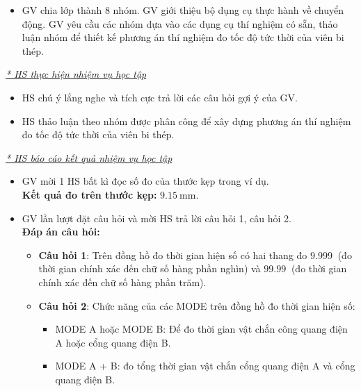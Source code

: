 {\begin{itemize}[label=-]
\begin{center}
		\end{center} 
		GV yêu cầu HS đọc phần sử dụng thiết bị đồng hồ đo thời gian hiện số trong phần chú ý SGK và trả lời các câu hỏi sau:
		\begin{itemize}[label=$\bullet$]
			\item \textbf{Câu hỏi 1:} Trên đồng hồ đo thời gian hiện số có mấy thang đo và ý nghĩa của mỗi thang đo là gì?
			\item \textbf{Câu hỏi 2:} Em hãy cho biết chức năng của các MODE  A, B, A+B, A$\leftrightarrow$B trên đồng hồ.
		\end{itemize} 
		\item GV chia lớp thành 8 nhóm. GV giới thiệu bộ dụng cụ thực hành về chuyển động. GV yêu cầu các nhóm dựa vào các dụng cụ thí nghiệm có sẵn, thảo luận nhóm để thiết kế phương án thí nghiệm đo tốc độ tức thời của viên bi thép.
	\end{itemize}
	\textit{\underline{* HS thực hiện nhiệm vụ học tập}}
	\begin{itemize}[label=-]
		\item HS chú ý lắng nghe và tích cực trả lời các câu hỏi gợi ý của GV.
		\item HS thảo luận theo nhóm được phân công để xây dựng phương án thí nghiệm đo tốc độ tức thời của viên bi thép.
	\end{itemize}
	\textit{\underline{* HS báo cáo kết quả nhiệm vụ học tập}}
	\begin{itemize}[label=-]
		\item GV mời 1 HS bất kì đọc số đo của thước kẹp trong ví dụ.\\
		\textbf{Kết quả đo trên thước kẹp:} $\SI{9.15}{\milli\meter}$.
		\item GV lần lượt đặt câu hỏi và mời HS trả lời câu hỏi 1, câu hỏi 2.\\
		\textbf{Đáp án câu hỏi:}
		\begin{itemize}[label=$\bullet$]
			\item \textbf{Câu hỏi 1}: Trên đồng hồ đo thời gian hiện số có hai thang đo $\SI{9.999}{}$ (đo thời gian chính xác đến chữ số hàng phần nghìn) và $\SI{99.99}{}$ (đo thời gian chính xác đến chữ số hàng phần trăm).
			\item \textbf{Câu hỏi 2}: Chức năng của các MODE trên đồng hồ đo thời gian hiện số:
			\begin{itemize}[label=\checkmark]
				\item MODE A hoặc MODE B: Để đo thời gian vật chắn công quang điện A hoặc cổng quang điện B.
				\item MODE A + B: đo tổng thời gian vật chắn cổng quang điện A và cổng quang điện B.

\end{itemize}
\end{itemize}
\end{itemize}}
